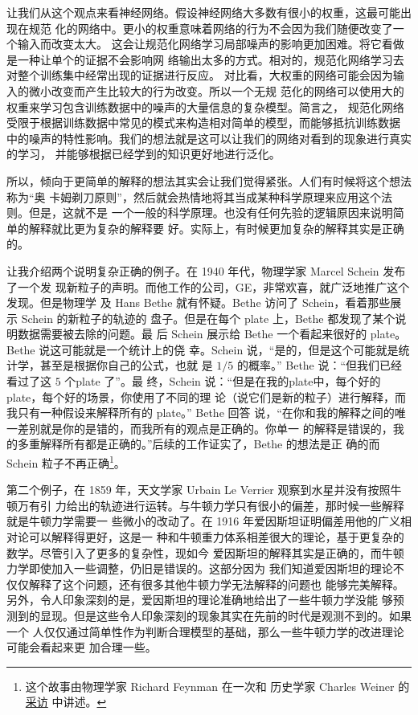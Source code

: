 让我们从这个观点来看神经网络。假设神经网络大多数有很小的权重，这最可能出现在规范
化的网络中。更小的权重意味着网络的行为不会因为我们随便改变了一个输入而改变太大。
这会让规范化网络学习局部噪声的影响更加困难。将它看做是一种让单个的证据不会影响网
络输出太多的方式。相对的，规范化网络学习去对整个训练集中经常出现的证据进行反应。
对比看，大权重的网络可能会因为输入的微小改变而产生比较大的行为改变。所以一个无规
范化的网络可以使用大的权重来学习包含训练数据中的噪声的大量信息的复杂模型。简言之，
规范化网络受限于根据训练数据中常见的模式来构造相对简单的模型，而能够抵抗训练数据
中的噪声的特性影响。我们的想法就是这可以让我们的网络对看到的现象进行真实的学习，
并能够根据已经学到的知识更好地进行泛化。

所以，倾向于更简单的解释的想法其实会让我们觉得紧张。人们有时候将这个想法称为“奥
卡姆剃刀原则”，然后就会热情地将其当成某种科学原理来应用这个法则。但是，这就不是
一个一般的科学原理。也没有任何先验的逻辑原因来说明简单的解释就比更为复杂的解释要
好。实际上，有时候更加复杂的解释其实是正确的。

让我介绍两个说明复杂正确的例子。在 1940 年代，物理学家 Marcel Schein 发布了一个发
现新粒子的声明。而他工作的公司，GE，非常欢喜，就广泛地推广这个发现。但是物理学
及 Hans Bethe 就有怀疑。Bethe 访问了 Schein，看着那些展示 Schein 的新粒子的轨迹的
盘子。但是在每个 plate 上，Bethe 都发现了某个说明数据需要被去除的问题。最
后 Schein 展示给 Bethe 一个看起来很好的 plate。Bethe 说这可能就是一个统计上的侥
幸。Schein 说，“是的，但是这个可能就是统计学，甚至是根据你自己的公式，也就
是 $1/5$ 的概率。” Bethe 说：“但我们已经看过了这 $5$ 个plate 了”。最
终，Schein 说：“但是在我的plate中，每个好的plate，每个好的场景，你使用了不同的理
论（说它们是新的粒子）进行解释，而我只有一种假设来解释所有的 plate。” Bethe 回答
说，“在你和我的解释之间的唯一差别就是你的是错的，而我所有的观点是正确的。你单一
的解释是错误的，我的多重解释所有都是正确的。”后续的工作证实了，Bethe 的想法是正
确的而 Schein 粒子不再正确\footnote{这个故事由物理学家 Richard Feynman 在一次和
历史学家 Charles Weiner 的%
  \href{https://www.aip.org/history-programs/niels-bohr-library/oral-histories/5020-4}{采访}%
  中讲述。}。

第二个例子，在 1859 年，天文学家 Urbain Le Verrier 观察到水星并没有按照牛顿万有引
力给出的轨迹进行运转。与牛顿力学只有很小的偏差，那时候一些解释就是牛顿力学需要一
些微小的改动了。在 1916 年爱因斯坦证明偏差用他的广义相对论可以解释得更好，这是一
种和牛顿重力体系相差很大的理论，基于更复杂的数学。尽管引入了更多的复杂性，现如今
爱因斯坦的解释其实是正确的，而牛顿力学即使加入一些调整，仍旧是错误的。这部分因为
我们知道爱因斯坦的理论不仅仅解释了这个问题，还有很多其他牛顿力学无法解释的问题也
能够完美解释。另外，令人印象深刻的是，爱因斯坦的理论准确地给出了一些牛顿力学没能
够预测到的显现。但是这些令人印象深刻的现象其实在先前的时代是观测不到的。如果一个
人仅仅通过简单性作为判断合理模型的基础，那么一些牛顿力学的改进理论可能会看起来更
加合理一些。

